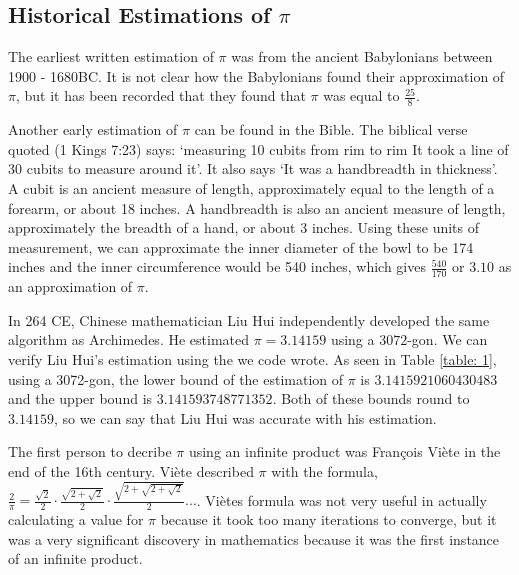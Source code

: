 \documentclass{article}
\begin{document}
\subsection{Historical Estimations of $\pi$}
The earliest written estimation of $\pi$ was from the ancient Babylonians between 1900 - 1680BC. It is not clear how the Babylonians found their approximation of $\pi$, but it has been recorded that they found that $\pi$ was equal to $\frac{25}{8}$. \cite{david}
\par Another early estimation of $\pi$ can be found in the Bible. The biblical verse quoted (1 Kings 7:23) says: `measuring 10 cubits from rim to rim It took a line of 30 cubits to measure around it'. It also says `It was a handbreadth in thickness'. A cubit is an ancient measure of length, approximately equal to the length of a forearm, or about 18 inches. A handbreadth is also an ancient measure of length, approximately the breadth of a hand, or about 3 inches. Using these units of measurement, we can approximate the inner diameter of the bowl to be 174 inches and the inner circumference would be 540 inches, which gives $\frac{540}{170}$ or $3.10$ as an approximation of $\pi$. \cite{kevin}
\par In 264 CE, Chinese mathematician Liu Hui independently developed the same algorithm as Archimedes. He estimated $\pi = 3.14159$ using a $3072$-gon. We can verify Liu Hui's estimation using the we code wrote. As seen in Table \ref{table: 1}, using a 3072-gon, the lower bound of the estimation of $\pi$ is $3.1415921060430483$ and the upper bound is $3.141593748771352$. Both of these bounds round to $3.14159$, so we can say that Liu Hui was accurate with his estimation.
\par The first person to decribe $\pi$ using an infinite product was François Viète in the end of the 16th century. \cite{david} Viète described $\pi$ with the formula, $\frac{2}{\pi} = \frac{\sqrt{2}}{2} \cdot \frac{\sqrt{2+\sqrt{2}}}{2} \cdot \frac{\sqrt{2 + \sqrt{2+\sqrt{2}}}}{2}...$. Viètes formula was not very useful in actually calculating a value for $\pi$ because it took too many iterations to converge, but it was a very significant discovery in mathematics because it was the first instance of an infinite product.
\end{document}
